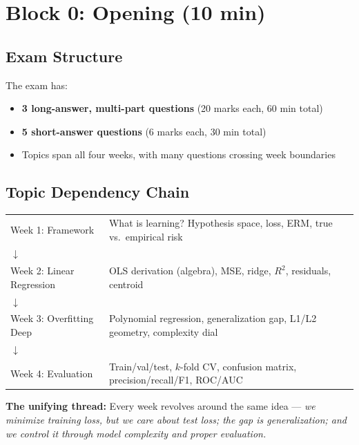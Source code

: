 \documentclass[11pt,a4paper]{article}
\begin{document}
\section{Block 0: Opening (10 min)}

\subsection{Exam Structure}

The exam has:
\begin{itemize}
    \item \textbf{3 long-answer, multi-part questions} (20 marks each, 60 min total)
    \item \textbf{5 short-answer questions} (6 marks each, 30 min total)
    \item Topics span all four weeks, with many questions crossing week boundaries
\end{itemize}

\subsection{Topic Dependency Chain}

\begin{center}
\begin{tabular}{ll}
Week 1: Framework & What is learning? Hypothesis space, loss, ERM, true vs.\ empirical risk \\
$\downarrow$ & \\
Week 2: Linear Regression & OLS derivation (algebra), MSE, ridge, $R^2$, residuals, centroid \\
$\downarrow$ & \\
Week 3: Overfitting Deep & Polynomial regression, generalization gap, L1/L2 geometry, complexity dial \\
$\downarrow$ & \\
Week 4: Evaluation & Train/val/test, $k$-fold CV, confusion matrix, precision/recall/F1, ROC/AUC \\
\end{tabular}
\end{center}

\textbf{The unifying thread:} Every week revolves around the same idea --- \emph{we minimize training loss, but we care about test loss; the gap is generalization; and we control it through model complexity and proper evaluation.}
\end{document}
